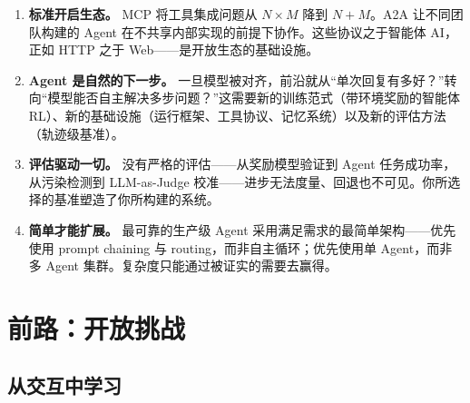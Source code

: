 \begin{enumerate}
  \item \textbf{标准开启生态。} MCP 将工具集成问题从 $N \times M$ 降到 $N + M$。A2A 让不同团队构建的 Agent 在不共享内部实现的前提下协作。这些协议之于智能体 AI，正如 HTTP 之于 Web——是开放生态的基础设施。
  \item \textbf{Agent 是自然的下一步。} 一旦模型被对齐，前沿就从“单次回复有多好？”转向“模型能否自主解决多步问题？”这需要新的训练范式（带环境奖励的智能体 RL）、新的基础设施（运行框架、工具协议、记忆系统）以及新的评估方法（轨迹级基准）。
  \item \textbf{评估驱动一切。} 没有严格的评估——从奖励模型验证到 Agent 任务成功率，从污染检测到 LLM-as-Judge 校准——进步无法度量、回退也不可见。你所选择的基准塑造了你所构建的系统。
  \item \textbf{简单才能扩展。} 最可靠的生产级 Agent 采用满足需求的最简单架构——优先使用 prompt chaining 与 routing，而非自主循环；优先使用单 Agent，而非多 Agent 集群。复杂度只能通过被证实的需要去赢得。
\end{enumerate}

\section{前路：开放挑战}
\label{the-road-ahead-open-challenges}

\subsection{从交互中学习}
\label{learning-from-interaction}

